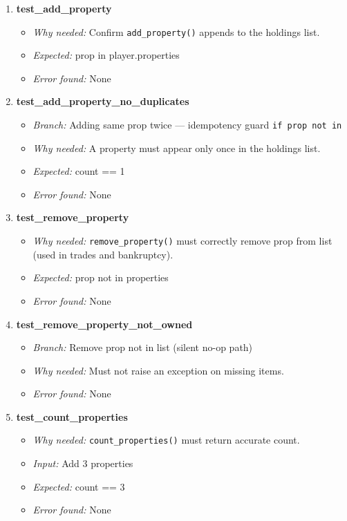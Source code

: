 \documentclass{article}
\begin{document}
\begin{enumerate}[resume, label=\textbf{TC\arabic*.}]

  \item \textbf{test\_add\_property}
  \begin{itemize}[noitemsep]
    \item \textit{Why needed:} Confirm \texttt{add\_property()} appends to the holdings list.
    \item \textit{Expected:} prop in player.properties
    \item \textit{Error found:} None
  \end{itemize}

  \item \textbf{test\_add\_property\_no\_duplicates}
  \begin{itemize}[noitemsep]
    \item \textit{Branch:} Adding same prop twice — idempotency guard \texttt{if prop not in}
    \item \textit{Why needed:} A property must appear only once in the holdings list.
    \item \textit{Expected:} count == 1
    \item \textit{Error found:} None
  \end{itemize}

  \item \textbf{test\_remove\_property}
  \begin{itemize}[noitemsep]
    \item \textit{Why needed:} \texttt{remove\_property()} must correctly remove prop from list (used in trades and bankruptcy).
    \item \textit{Expected:} prop not in properties
    \item \textit{Error found:} None
  \end{itemize}

  \item \textbf{test\_remove\_property\_not\_owned}
  \begin{itemize}[noitemsep]
    \item \textit{Branch:} Remove prop not in list (silent no-op path)
    \item \textit{Why needed:} Must not raise an exception on missing items.
    \item \textit{Error found:} None
  \end{itemize}

  \item \textbf{test\_count\_properties}
  \begin{itemize}[noitemsep]
    \item \textit{Why needed:} \texttt{count\_properties()} must return accurate count.
    \item \textit{Input:} Add 3 properties
    \item \textit{Expected:} count == 3
    \item \textit{Error found:} None
  \end{itemize}

\end{enumerate}
\end{document}
